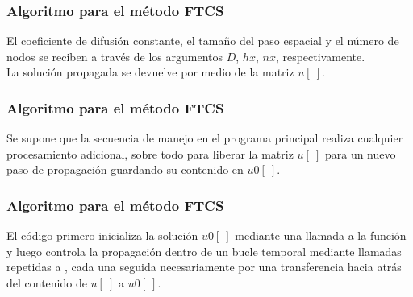 \documentclass[12pt]{beamer}
\begin{document}
\begin{frame}
\frametitle{Algoritmo para el método FTCS}
El coeficiente de difusión constante, el tamaño del paso espacial y el número de nodos se reciben a través de los argumentos $D$, $hx$, $nx$, respectivamente.
\\
La solución propagada se devuelve por medio de la matriz $u[ \ ]$.
\end{frame}
\begin{frame}
\frametitle{Algoritmo para el método FTCS}
Se supone que la secuencia de manejo en el programa principal realiza cualquier procesamiento adicional, sobre todo para liberar la matriz $u[ \ ]$ para un nuevo paso de propagación guardando su contenido en $u0[ \ ]$.
\end{frame}
\begin{frame}
\frametitle{Algoritmo para el método FTCS}
El código primero inicializa la solución $u0[ \ ]$ mediante una llamada a la función  y luego controla la propagación dentro de un bucle temporal mediante llamadas repetidas a , cada una seguida necesariamente por una transferencia hacia atrás del contenido de $u[ \ ]$ a $u0[ \ ]$.    
\end{frame}
\end{document}
